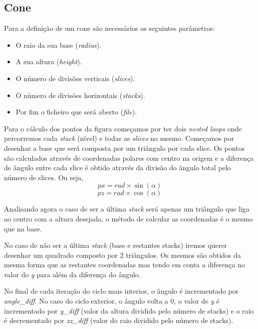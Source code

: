 \documentclass[14pt, a4 paper]{article}
\begin{document}
\subsection{Cone}
Para a definição de um cone são necessários os seguintes parâmetros:

\begin{itemize}
\item O raio da sua base (\textit{radius}).

\item A sua altura (\textit{height}).

\item O número de divisões verticais (\textit{slices}).

\item O número de divisões horizontais (\textit{stacks}).

\item Por fim o ficheiro que será aberto (\textit{file}).
\end{itemize}

Para o cálculo dos pontos da figura começamos por ter dois \textit{nested loops} onde percorremos cada \textit{stack} (nível) e todas as \textit{slices} no mesmo. Começamos por desenhar a base que será composta por um triângulo por cada slice. Os pontos são calculados através de coordenadas polares com centro na origem e a diferença de ângulo entre cada slice é obtido através da divisão do ângulo total pelo número de slices.
Ou seja, 
$$ 
px = rad \times \sin(\alpha)
$$
$$
pz = rad \times \cos(\alpha)
$$

Analisando agora o caso de ser a última \textit{stack} será apenas um triângulo que liga ao centro com a altura desejada, o método de calcular as coordenadas é o mesmo que na base.  

No caso de não ser a última \textit{stack} (base e restantes stacks) iremos querer desenhar um quadrado composto por $2$ triângulos. Os mesmos são obtidos da mesma forma que as restantes coordenadas mas tendo em conta a diferença no valor do \textit{y} para além da diferença do ângulo.

No final de cada iteração do ciclo mais interior, o ângulo é incrementado por \textit{angle\_diff}.
No caso do ciclo exterior, o ângulo volta a $0$, o valor de \textit{y} é incrementado por \textit{y\_diff} (valor da altura dividido pelo número de stacks) e o raio é decrementado por \textit{xz\_diff} (valor do raio dividido pelo número de stacks).
\end{document}
